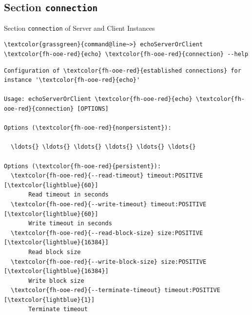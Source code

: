 \subsection{Section \textcolor{fh-ooe-red}{\lstinline|connection|}}

\begin{frame}[fragile]{Section \alert{\lstinline|connection|} of Server and Client Instances}
\begin{scriptsize}
\begin{Verbatim}[commandchars=\\\{\}]
\textcolor{grassgreen}{command@line~>} echoServerOrClient \textcolor{fh-ooe-red}{echo} \textcolor{fh-ooe-red}{connection} --help
\end{Verbatim}
\begin{Verbatim}[commandchars=\\\{\},frame=leftline,rulecolor=\color{fh-ooe-red}]
Configuration of \textcolor{fh-ooe-red}{established connections} for instance '\textcolor{fh-ooe-red}{echo}'

Usage: echoServerOrClient \textcolor{fh-ooe-red}{echo} \textcolor{fh-ooe-red}{connection} [OPTIONS]

Options (\textcolor{fh-ooe-red}{nonpersistent}):

  \ldots{} \ldots{} \ldots{} \ldots{} \ldots{} \ldots{}

Options (\textcolor{fh-ooe-red}{persistent}):
  \textcolor{fh-ooe-red}{--read-timeout} timeout:POSITIVE [\textcolor{lightblue}{60}]
       Read timeout in seconds
  \textcolor{fh-ooe-red}{--write-timeout} timeout:POSITIVE [\textcolor{lightblue}{60}]
       Write timeout in seconds
  \textcolor{fh-ooe-red}{--read-block-size} size:POSITIVE [\textcolor{lightblue}{16384}]
       Read block size
  \textcolor{fh-ooe-red}{--write-block-size} size:POSITIVE [\textcolor{lightblue}{16384}]
       Write block size
  \textcolor{fh-ooe-red}{--terminate-timeout} timeout:POSITIVE [\textcolor{lightblue}{1}]
       Terminate timeout

\end{Verbatim}
\end{scriptsize}
\end{frame}
